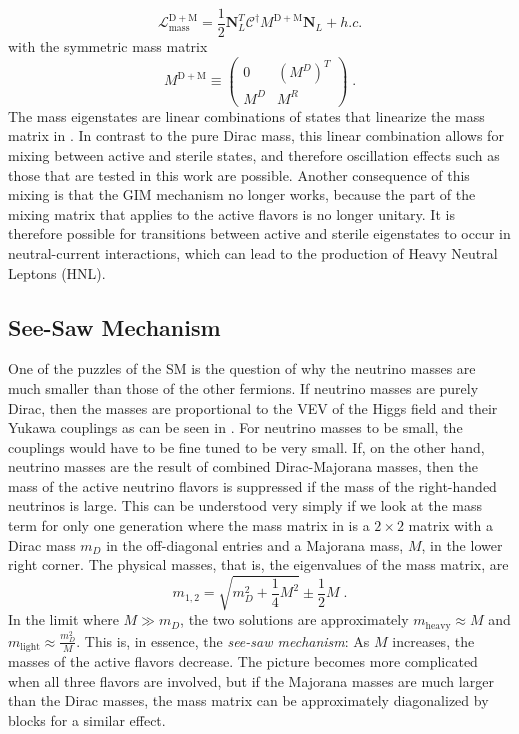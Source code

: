 \begin{equation}
  \mathcal{L}_\mathrm{mass}^\mathrm{D+M} = \frac{1}{2} \boldsymbol{N}_L^T \mathcal{C}^\dag M^\mathrm{D+M} \boldsymbol{N}_L + h.c.
\end{equation}
with the symmetric mass matrix
\begin{equation}
  M^\mathrm{D+M} \equiv
  \begin{pmatrix}
  0 & (M^D)^T \\
  M^D & M^R
  \end{pmatrix}\;.\label{eq:dm-mass-matrix}
\end{equation}
The mass eigenstates are linear combinations of states that linearize the mass matrix in .
In contrast to the pure Dirac mass, this linear combination allows for mixing between active and sterile states, and therefore oscillation effects such as those that are tested in this work are possible.
Another consequence of this mixing is that the GIM mechanism no longer works, because the part of the mixing matrix that applies to the active flavors is no longer unitary.
It is therefore possible for transitions between active and sterile eigenstates to occur in neutral-current interactions, which can lead to the production of Heavy Neutral Leptons (HNL).

\subsection{See-Saw Mechanism}

One of the puzzles of the SM is the question of why the neutrino masses are much smaller than those of the other fermions.
If neutrino masses are purely Dirac, then the masses are proportional to the VEV of the Higgs field and their Yukawa couplings as can be seen in .
For neutrino masses to be small, the couplings would have to be fine tuned to be very small.
If, on the other hand, neutrino masses are the result of combined Dirac-Majorana masses, then the mass of the active neutrino flavors is suppressed if the mass of the right-handed neutrinos is large.
This can be understood very simply if we look at the mass term for only one generation where the mass matrix in  is a $2\times2$ matrix with a Dirac mass $m_D$ in the off-diagonal entries and a Majorana mass, $M$, in the lower right corner.
The physical masses, that is, the eigenvalues of the mass matrix, are
\begin{equation}
    m_{1,2} = \sqrt{m_D^2 + \frac{1}{4}M^2} \pm \frac{1}{2} M\;.
\end{equation}
In the limit where $M \gg m_D$, the two solutions are approximately $m_\mathrm{heavy} \approx M$ and $m_\mathrm{light} \approx \frac{m_D^2}{M}$.
This is, in essence, the \emph{see-saw mechanism}: As $M$ increases, the masses of the active flavors decrease.
The picture becomes more complicated when all three flavors are involved, but if the Majorana masses are much larger than the Dirac masses, the mass matrix can be approximately diagonalized by blocks for a similar effect.

